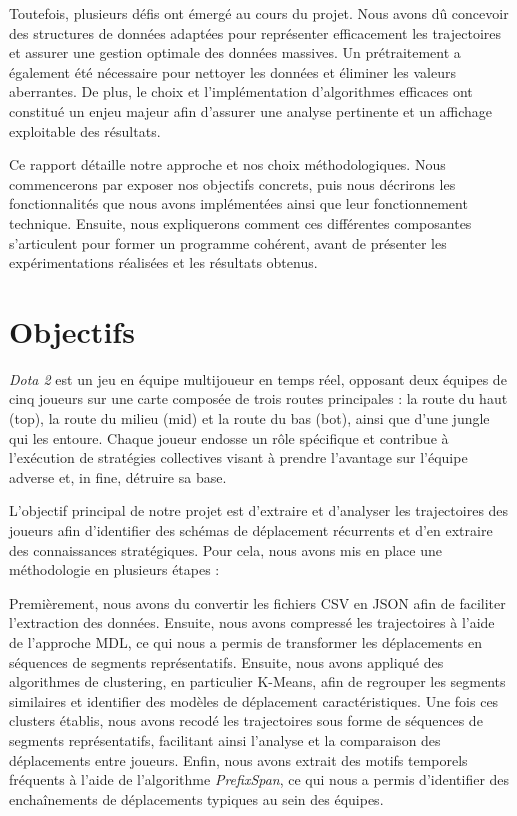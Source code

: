 \documentclass{article}
\begin{document}
        Toutefois, plusieurs défis ont émergé au cours du projet. Nous avons dû concevoir des structures de données adaptées pour représenter efficacement les trajectoires et assurer une gestion optimale des données massives. Un prétraitement a également été nécessaire pour nettoyer les données et éliminer les valeurs aberrantes. De plus, le choix et l'implémentation d'algorithmes efficaces ont constitué un enjeu majeur afin d'assurer une analyse pertinente et un affichage exploitable des résultats.
    
        Ce rapport détaille notre approche et nos choix méthodologiques. Nous commencerons par exposer nos objectifs concrets, puis nous décrirons les fonctionnalités que nous avons implémentées ainsi que leur fonctionnement technique. Ensuite, nous expliquerons comment ces différentes composantes s'articulent pour former un programme cohérent, avant de présenter les expérimentations réalisées et les résultats obtenus.
    
    

    \section{Objectifs}

        \textit{Dota 2} est un jeu en équipe multijoueur en temps réel, opposant deux équipes de cinq joueurs sur une carte composée de trois routes principales : la route du haut (top), la route du milieu (mid) et la route du bas (bot), ainsi que d'une jungle qui les entoure. Chaque joueur endosse un rôle spécifique et contribue à l'exécution de stratégies collectives visant à prendre l'avantage sur l'équipe adverse et, in fine, détruire sa base.
        
        L'objectif principal de notre projet est d'extraire et d'analyser les trajectoires des joueurs afin d'identifier des schémas de déplacement récurrents et d'en extraire des connaissances stratégiques. Pour cela, nous avons mis en place une méthodologie en plusieurs étapes :
        
        Premièrement, nous avons du convertir les fichiers CSV en JSON afin de faciliter l'extraction des données. Ensuite, nous avons compressé les trajectoires à l'aide de l'approche MDL, ce qui nous a permis de transformer les déplacements en séquences de segments représentatifs. Ensuite, nous avons appliqué des algorithmes de clustering, en particulier K-Means, afin de regrouper les segments similaires et identifier des modèles de déplacement caractéristiques. Une fois ces clusters établis, nous avons recodé les trajectoires sous forme de séquences de segments représentatifs, facilitant ainsi l'analyse et la comparaison des déplacements entre joueurs. Enfin, nous avons extrait des motifs temporels fréquents à l'aide de l'algorithme \textit{PrefixSpan}, ce qui nous a permis d'identifier des enchaînements de déplacements typiques au sein des équipes.
        
\end{document}
